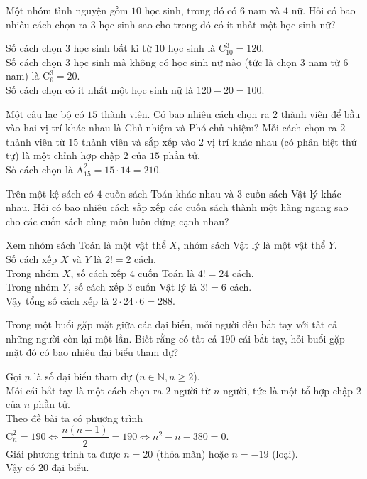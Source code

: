 \begin{ex}%
	Một nhóm tình nguyện gồm $10$ học sinh, trong đó có $6$ nam và $4$ nữ. Hỏi có bao nhiêu cách chọn ra $3$ học sinh sao cho trong đó có ít nhất một học sinh nữ?
	\par
	\loigiai
	{
		Số cách chọn $3$ học sinh bất kì từ $10$ học sinh là $\mathrm{C}_{10}^3 = 120$. \\
		Số cách chọn $3$ học sinh mà không có học sinh nữ nào (tức là chọn $3$ nam từ $6$ nam) là $\mathrm{C}_6^3 = 20$. \\
		Số cách chọn có ít nhất một học sinh nữ là $120 - 20 = 100$.
	}
\end{ex}
\begin{ex}%
	Một câu lạc bộ có $15$ thành viên. Có bao nhiêu cách chọn ra $2$ thành viên để bầu vào hai vị trí khác nhau là Chủ nhiệm và Phó chủ nhiệm?
	\loigiai
	{
		Mỗi cách chọn ra $2$ thành viên từ $15$ thành viên và sắp xếp vào $2$ vị trí khác nhau (có phân biệt thứ tự) là một chỉnh hợp chập $2$ của $15$ phần tử. \\
		Số cách chọn là $\mathrm{A}_{15}^2 = 15 \cdot  14 = 210$.
	}
\end{ex}
\begin{ex}%
	Trên một kệ sách có $4$ cuốn sách Toán khác nhau và $3$ cuốn sách Vật lý khác nhau. Hỏi có bao nhiêu cách sắp xếp các cuốn sách thành một hàng ngang sao cho các cuốn sách cùng môn luôn đứng cạnh nhau?
	\par
	\loigiai
	{
		Xem nhóm sách Toán là một vật thể $X$, nhóm sách Vật lý là một vật thể $Y$. \\
		Số cách xếp $X$ và $Y$ là $2! = 2$ cách. \\
		Trong nhóm $X$, số cách xếp $4$ cuốn Toán là $4! = 24$ cách. \\
		Trong nhóm $Y$, số cách xếp $3$ cuốn Vật lý là $3! = 6$ cách. \\
		Vậy tổng số cách xếp là $2 \cdot  24 \cdot  6 = 288$.
	}
\end{ex}
\begin{ex}%
	Trong một buổi gặp mặt giữa các đại biểu, mỗi người đều bắt tay với tất cả những người còn lại một lần. Biết rằng có tất cả $190$ cái bắt tay, hỏi buổi gặp mặt đó có bao nhiêu đại biểu tham dự?
	\par
	\loigiai
	{
		Gọi $n$ là số đại biểu tham dự ($n \in \mathbb{N}, n \ge 2$). \\
		Mỗi cái bắt tay là một cách chọn ra $2$ người từ $n$ người, tức là một tổ hợp chập $2$ của $n$ phần tử. \\
		Theo đề bài ta có phương trình $\mathrm{C}_n^2 = 190 \Leftrightarrow \dfrac{n(n-1)}{2} = 190 \Leftrightarrow n^2 - n - 380 = 0$. \\
		Giải phương trình ta được $n = 20$ (thỏa mãn) hoặc $n = -19$ (loại). \\
		Vậy có $20$ đại biểu.
	}
\end{ex}
